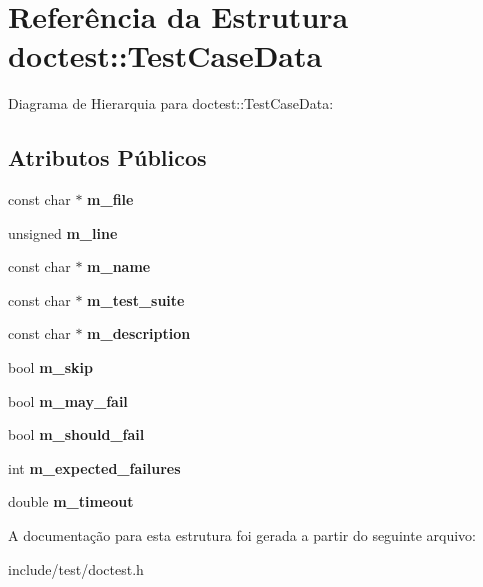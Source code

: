 \hypertarget{structdoctest_1_1TestCaseData}{}\section{Referência da Estrutura doctest\+:\+:Test\+Case\+Data}
\label{structdoctest_1_1TestCaseData}


Diagrama de Hierarquia para doctest\+:\+:Test\+Case\+Data\+:
\subsection*{Atributos Públicos}
\begin{DoxyCompactItemize}
\item 
\mbox{\label{structdoctest_1_1TestCaseData_a2fd47118d7424ba2e3c142b18d47167f}} 
const char $\ast$ {\bfseries m\+\_\+file}
\item 
\mbox{\label{structdoctest_1_1TestCaseData_aaabb9765e7aa39416c058a9cbccef57f}} 
unsigned {\bfseries m\+\_\+line}
\item 
\mbox{\label{structdoctest_1_1TestCaseData_a0cb34895130be773e624526d68e5b2cd}} 
const char $\ast$ {\bfseries m\+\_\+name}
\item 
\mbox{\label{structdoctest_1_1TestCaseData_ae264da66ff0e88a34c467d364dd18840}} 
const char $\ast$ {\bfseries m\+\_\+test\+\_\+suite}
\item 
\mbox{\label{structdoctest_1_1TestCaseData_abd855851b4b9edbaf46c3458abc1ba80}} 
const char $\ast$ {\bfseries m\+\_\+description}
\item 
\mbox{\label{structdoctest_1_1TestCaseData_a0c2353bd3fd8c2fa84d34ab4e973e038}} 
bool {\bfseries m\+\_\+skip}
\item 
\mbox{\label{structdoctest_1_1TestCaseData_a887b70bf52f74724f0d7fe99d43a8783}} 
bool {\bfseries m\+\_\+may\+\_\+fail}
\item 
\mbox{\label{structdoctest_1_1TestCaseData_a037f6dfb931aff9c9b17f31203a3987e}} 
bool {\bfseries m\+\_\+should\+\_\+fail}
\item 
\mbox{\label{structdoctest_1_1TestCaseData_a6c5995f53ad39769bf06600e562ea9eb}} 
int {\bfseries m\+\_\+expected\+\_\+failures}
\item 
\mbox{\label{structdoctest_1_1TestCaseData_a8cab4a7998b486bafa81498f93dd4d91}} 
double {\bfseries m\+\_\+timeout}
\end{DoxyCompactItemize}


A documentação para esta estrutura foi gerada a partir do seguinte arquivo\+:\begin{DoxyCompactItemize}
\item 
include/test/doctest.\+h\end{DoxyCompactItemize}
